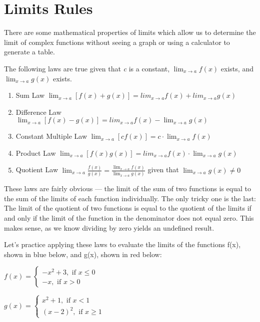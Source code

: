 \section{Limits Rules}
There are some mathematical properties of limits which allow us to determine the 
limit of complex functions without seeing a graph or using a calculator to generate 
a table. 

The following laws are true given that \textit{c} is a constant, $\lim_{x\to a} 
f(x) $ exists, and $\lim_{x\to a} g(x) $ exists.

\begin{enumerate}
    \item Sum Law $\lim_{x\to a} \left[f(x) + g(x) \right] = lim_{x\to a} f(x) 
    + lim_{x\to a} g(x)$
    \item Difference Law $\lim_{x\to a} \left[f(x) - g(x) \right] = 
    lim_{x\to a} f(x) - \lim_{x\to a} g(x)$
    \item Constant Multiple Law $\lim_{x\to a} \left[\textit{c}f(x) \right] = 
    \textit{c} \cdot \lim_{x\to a} f(x) $
    \item Product Law $\lim_{x\to a} \left[f(x)g(x) \right] = lim_{x\to a}f(x) 
    \cdot \lim_{x\to a} g(x)$
    \item Quotient Law $\lim_{x\to a} \frac{f(x)}{g(x)} = \frac{\lim_{x\to a} 
    f(x)}{\lim_{x\to a} g(x)}$ given that $\lim_{x\to a} g(x) \neq 0$
\end{enumerate}
These laws are fairly obvious --- the limit of the sum of two functions is equal to 
the sum of the limits of each function individually. The only tricky one is the 
last: The limit of the quotient of two functions is equal to the quotient of the 
limits if and only if the limit of the function in the denominator does not equal 
zero. This makes sense, as we know dividing by zero yields an undefined result. 

Let's practice applying these laws to evaluate the limits of the functions f(x), 
shown in blue below, and g(x), shown in red below:

$f(x) = \begin{cases}
    -x^2+3, \text{ if } x \leq 0\\
    -x, \text{ if } x > 0
\end{cases}$

$g(x) = \begin{cases}
   x^2+1, \text{ if } x < 1 \\
    (x-2)^2, \text{ if } x \geq 1
\end{cases}$

